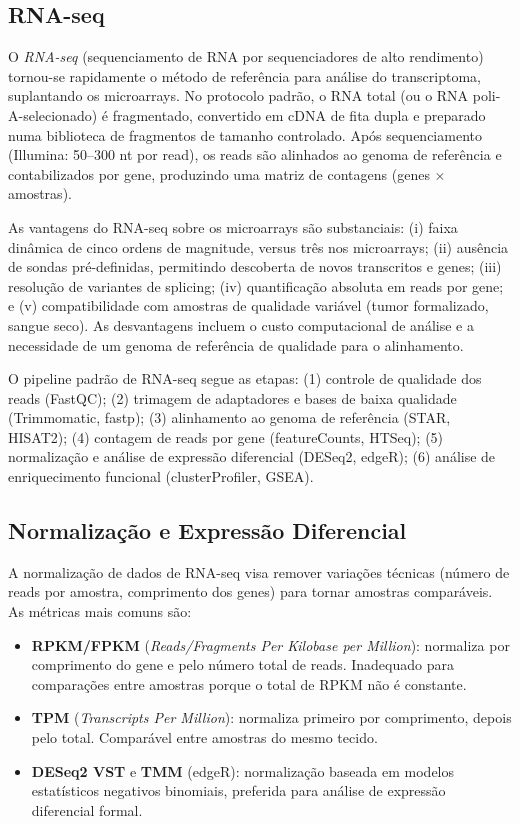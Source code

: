 \subsection{RNA-seq}

O \emph{RNA-seq} (sequenciamento de RNA por sequenciadores de alto rendimento) tornou-se
rapidamente o método de referência para análise do transcriptoma, suplantando os
microarrays. No protocolo padrão, o RNA total (ou o RNA poli-A-selecionado) é fragmentado,
convertido em cDNA de fita dupla e preparado numa biblioteca de fragmentos de tamanho
controlado. Após sequenciamento (Illumina: 50--300 nt por read), os reads são alinhados ao
genoma de referência e contabilizados por gene, produzindo uma matriz de contagens
(genes × amostras).

As vantagens do RNA-seq sobre os microarrays são substanciais: (i) faixa dinâmica de cinco
ordens de magnitude, versus três nos microarrays; (ii) ausência de sondas pré-definidas,
permitindo descoberta de novos transcritos e genes; (iii) resolução de variantes de
splicing; (iv) quantificação absoluta em reads por gene; e (v) compatibilidade com
amostras de qualidade variável (tumor formalizado, sangue seco). As desvantagens incluem o
custo computacional de análise e a necessidade de um genoma de referência de qualidade para
o alinhamento.

O pipeline padrão de RNA-seq segue as etapas: (1) controle de qualidade dos reads (FastQC);
(2) trimagem de adaptadores e bases de baixa qualidade (Trimmomatic, fastp); (3)
alinhamento ao genoma de referência (STAR, HISAT2); (4) contagem de reads por gene
(featureCounts, HTSeq); (5) normalização e análise de expressão diferencial (DESeq2,
edgeR); (6) análise de enriquecimento funcional (clusterProfiler, GSEA).

\subsection{Normalização e Expressão Diferencial}

A normalização de dados de RNA-seq visa remover variações técnicas (número de reads por
amostra, comprimento dos genes) para tornar amostras comparáveis. As métricas mais comuns
são:

\begin{itemize}
\item \textbf{RPKM/FPKM} (\textit{Reads/Fragments Per Kilobase per Million}): normaliza
  por comprimento do gene e pelo número total de reads. Inadequado para comparações entre
  amostras porque o total de RPKM não é constante.
\item \textbf{TPM} (\textit{Transcripts Per Million}): normaliza primeiro por comprimento,
  depois pelo total. Comparável entre amostras do mesmo tecido.
\item \textbf{DESeq2 VST} e \textbf{TMM} (edgeR): normalização baseada em modelos
  estatísticos negativos binomiais, preferida para análise de expressão diferencial formal.
\end{itemize}


